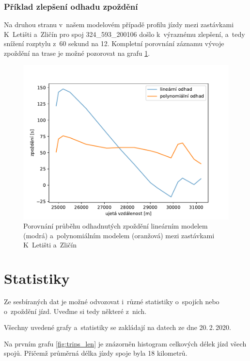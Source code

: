 \subsubsection{Příklad zlepšení odhadu zpoždění}

Na druhou stranu v~našem modelovém případě profilu jízdy mezi zastávkami K~Letišti a~Zličín pro spoj 324\_593\_200106 došlo k~výraznému zlepšení, a~tedy snížení rozptylu z~60 sekund na 12. Kompletní porovnání záznamu vývoje zpoždění na trase je možné pozorovat na grafu \ref{fig:compare_534_421}.


\begin{figure}
   \centering
 \includegraphics[width=1\linewidth]{../img/compare_534_421}
 \caption{Porovnání průběhu odhadnutých zpoždění lineárním modelem (modrá) a~polynomiálním modelem (oranžová) mezi zastávkami K~Letišti a~Zličín}
 \label{fig:compare_534_421}
\end{figure}


\section{Statistiky} \label{section:stats}

Ze sesbíraných dat je možné odvozovat i~různé statistiky o~spojích nebo o~zpoždění jízd. Uveďme si tedy některé z~nich.

\bigbreak

Všechny uvedené grafy a~statistiky se zakládají na datech ze dne 20.\,2.\,2020.


\bigbreak

Na prvním grafu \ref{fig:trips_len} je znázorněn histogram celkových délek jízd všech spojů. Přičemž průměrná délka jízdy spoje byla 18 kilometrů.

